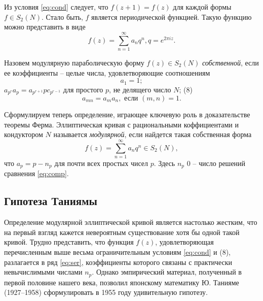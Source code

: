 \begin{multicols}{3}
Из условия \eqref{eq:cond} следует, что $f(z + 1) = f(z)$ для каждой формы $f \in S_2(N)$. Стало быть, $f$ является периодической функцией. Такую функцию можно представить в виде
\begin{equation}
    \tag{7}
    \label{eq:ser}
    f(z) = \sum_{n=1}^{\infty} a_nq^n, q = e^{2\pi iz}.
\end{equation}

Назовем модулярную параболическую форму $f(z) \in S_2(N)$ \emph{собственной}, если ее коэффициенты -- целые числа, удовлетворяющие соотношениям
\begin{equation*}
    a_1 = 1;
\end{equation*}
$a_{p^r}a_p = a_{p^{r+1}}pc_{p^{r-1}}$ для простого $p$, не делящего число $N$; (8)
\begin{equation*}
    a_{mn} = a_ma_n, \text{ если } (m, n) = 1.
\end{equation*}

Сформулируем теперь определение, играющее ключевую роль в доказательстве теоремы Ферма. Эллиптическая кривая с рациональными коффициентами и кондуктором $N$ называется \emph{модулярной}, если найдется такая собственная форма
\begin{equation}
    \tag{9}
    f(z) = \sum_{n=1}^{\infty} a_nq^n \in S_2(N),
\end{equation}
что $a_p = p - n_p$ для почти всех простых чисел $p$. Здесь $n_p$ 0 -- число решений сравнения \eqref{eq:comp}.
\subsection*{Гипотеза Таниямы}
\noindent
Определение модулярной эллиптической кривой является настолько жестким, что на первый взгляд кажется невероятным существование хотя бы одной такой кривой. Трудно представить, что функция $f(z)$, удовлетворяющая перечисленным выше весьма ограничительным условиям \eqref{eq:cond} и (8), разлагается в ряд \eqref{eq:ser}, коэффициенты которого связаны с практически невычислимыми числами $n_p$. Однако эмпирический материал, полученный в первой половине нашего века, позволил японскому математику Ю. Танияме (1927–1958) сформулировать в 1955 году удивительную гипотезу.
\end{multicols}
